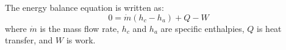 The energy balance equation is written as:  
\[
0 = \dot{m} (h_c - h_a) + Q - W
\]  
where \( \dot{m} \) is the mass flow rate, \( h_c \) and \( h_a \) are specific enthalpies, \( Q \) is heat transfer, and \( W \) is work.